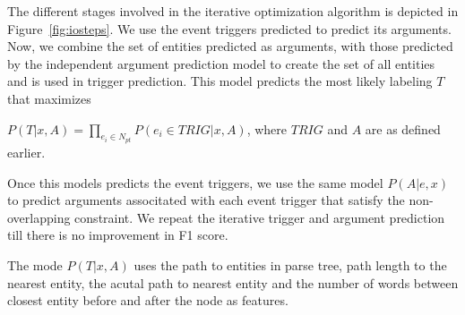 The different stages involved in the iterative optimization algorithm is depicted in Figure~\ref{fig:iosteps}. We use the event triggers predicted to predict its arguments. Now, we combine the set of entities predicted as arguments, with those predicted by the independent argument prediction model to create the set of all entities and is used in trigger prediction. This model predicts the most likely labeling $T$ that maximizes

$P(T | x, A) = \prod_{e_{i}\in N_{pt}} P(e_{i}\in TRIG | x, A) $, where $TRIG$ and $A$ are as defined earlier.

Once this models predicts the event triggers, we use the same model $P(A | e,x)$ to predict arguments associtated with each event trigger that satisfy the non-overlapping constraint. We repeat the iterative trigger and argument prediction till there is no improvement in F1 score.

The mode $P(T | x, A)$ uses the path to entities in parse tree, path length to the nearest entity, the acutal path to nearest entity and the number of words between closest entity before and after the node as features.
